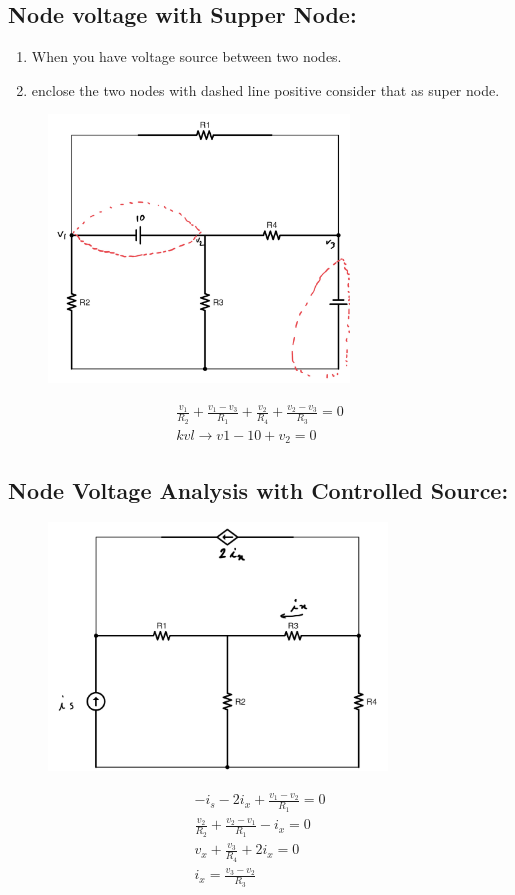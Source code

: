 \documentclass[a4paper,12]{article}
\begin{document}
\subsection{Node voltage with Supper Node:}
\begin{enumerate}
    \item When you have voltage source between two nodes.
    \item enclose the two nodes with dashed line positive consider that as super node.
\end{enumerate}
\begin{figure}[H]
    \centering
    \includegraphics[width=80mm]{Image/6.jpg}
\end{figure}
\begin{gather}
    \frac{v_1}{R_2}+\frac{v_1-v_3}{R_1}+\frac{v_2}{R_4}+\frac{v_2-v_3}{R_3}=0\\
    kvl\rightarrow v1-10+v_2=0
\end{gather}
\subsection{Node Voltage Analysis with Controlled Source:}

\begin{figure}[H]
    \centering
    \includegraphics[width=90mm]{Image/8.jpg}
\end{figure}
\begin{align}
    -i_s-2i_x+\frac{v_1-v_2}{R_1}=0\\
    \frac{v_2}{R_2}+\frac{v_2-v_1}{R_1}-i_x=0\\
    v_x+\frac{v_3}{R_4}+2i_x=0\\
    i_x=\frac{v_3-v_2}{R_3}
\end{align}
\end{document}
